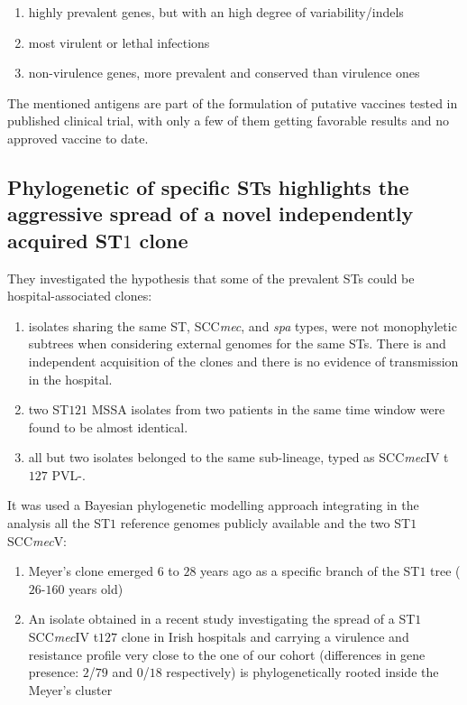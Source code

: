 \begin{enumerate}
    \item highly prevalent genes, but with an high degree of variability/indels
    \item most virulent or lethal infections
    \item non-virulence genes, more prevalent and conserved than virulence ones
\end{enumerate}

The mentioned antigens are part of the formulation of putative vaccines tested in published clinical trial, with only a few of them getting favorable results and no approved vaccine to date. 

\subsection{Phylogenetic of specific STs highlights the aggressive spread of a novel independently acquired ST$1$ clone}

They investigated the hypothesis that some of the prevalent STs could be hospital-associated clones: 
\begin{enumerate}
    \item isolates sharing the same ST, SCC\emph{mec}, and \emph{spa} types, were not monophyletic subtrees when considering external genomes for the same STs. There is and independent acquisition of the clones and there is no evidence of transmission in the hospital.
    \item two ST$121$ MSSA isolates from two patients in the same time window were found to be almost identical. 
    \item all but two isolates belonged to the same sub-lineage, typed as SCC\emph{mec}IV t$127$ PVL-.
\end{enumerate}

It was used a Bayesian phylogenetic modelling approach integrating in the analysis all the ST$1$ reference genomes publicly available and the two ST$1$ SCC\emph{mec}V: 

\begin{enumerate}
    \item Meyer's clone emerged $6$ to $28$ years ago as a specific branch of the ST$1$ tree ($26$-$160$ years old)
    \item An isolate obtained in a recent study investigating the spread of a ST$1$ SCC\emph{mec}IV t$127$ clone in Irish hospitals and carrying a virulence and resistance profile very close to the one of our cohort (differences in gene presence: $2$/$79$ and $0$/$18$ respectively) is phylogenetically  rooted inside the Meyer's cluster
\end{enumerate}

